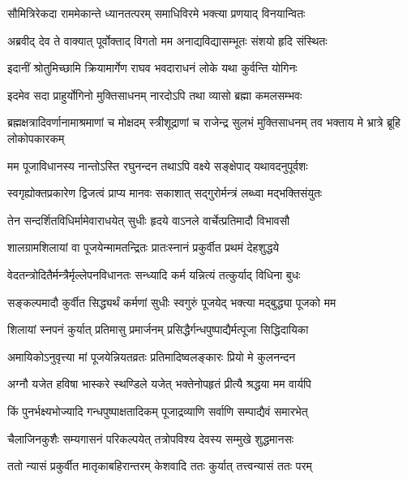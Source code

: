 \twolineshloka
{सौमित्रिरेकदा राममेकान्ते ध्यानतत्परम्}
{समाधिविरमे भक्त्या प्रणयाद् विनयान्वितः} %

\twolineshloka
{अब्रवीद् देव ते वाक्यात् पूर्वोक्ताद् विगतो मम}
{अनाद्यविद्यासम्भूतः संशयो हृदि संस्थितः} %

\twolineshloka
{इदानीं श्रोतुमिच्छामि क्रियामार्गेण राघव}
{भवदाराधनं लोके यथा कुर्वन्ति योगिनः} %

\twolineshloka
{इदमेव सदा प्राहुर्योगिनो मुक्तिसाधनम्}
{नारदोऽपि तथा व्यासो ब्रह्मा कमलसम्भवः} %

\threelineshloka
{ब्रह्मक्षत्रादिवर्णानामाश्रमाणां च मोक्षदम्}
{स्त्रीशूद्राणां च राजेन्द्र सुलभं मुक्तिसाधनम्}
{तव भक्ताय मे भ्रात्रे ब्रूहि लोकोपकारकम्} %


\twolineshloka
{मम पूजाविधानस्य नान्तोऽस्ति रघुनन्दन}
{तथाऽपि वक्ष्ये सङ्क्षेपाद् यथावदनुपूर्वशः} %

\twolineshloka
{स्वगृह्योक्तप्रकारेण द्विजत्वं प्राप्य मानवः}
{सकाशात् सद्गुरोर्मन्त्रं लब्ध्वा मद्भक्तिसंयुतः} %

\twolineshloka
{तेन सन्दर्शितविधिर्मामेवाराधयेत् सुधीः}
{हृदये वाऽनले वार्चेत्प्रतिमादौ विभावसौ} %

\twolineshloka
{शालग्रामशिलायां वा पूजयेन्मामतन्द्रितः}
{प्रातःस्नानं प्रकुर्वीत प्रथमं देहशुद्धये} %

\twolineshloka
{वेदतन्त्रोदितैर्मन्त्रैर्मृल्लेपनविधानतः}
{सन्ध्यादि कर्म यन्नित्यं तत्कुर्याद् विधिना बुधः} %

\twolineshloka
{सङ्कल्पमादौ कुर्वीत सिद्ध्यर्थं कर्मणां सुधीः}
{स्वगुरुं पूजयेद् भक्त्या मद्बुद्ध्या पूजको मम} %

\twolineshloka
{शिलायां स्नपनं कुर्यात् प्रतिमासु प्रमार्जनम्}
{प्रसिद्धैर्गन्धपुष्पाद्यैर्मत्पूजा सिद्धिदायिका} %

\twolineshloka
{अमायिकोऽनुवृत्त्या मां पूजयेन्नियतव्रतः}
{प्रतिमादिष्वलङ्कारः प्रियो मे कुलनन्दन} %

\twolineshloka
{अग्नौ यजेत हविषा भास्करे स्थण्डिले यजेत्}
{भक्तेनोपहृतं प्रीत्यै श्रद्धया मम वार्यपि} %

\twolineshloka
{किं पुनर्भक्ष्यभोज्यादि गन्धपुष्पाक्षतादिकम्}
{पूजाद्रव्याणि सर्वाणि सम्पाद्यैवं समारभेत्} %

\twolineshloka
{चैलाजिनकुशैः सम्यगासनं परिकल्पयेत्}
{तत्रोपविश्य देवस्य सम्मुखे शुद्धमानसः} %

\twolineshloka
{ततो न्यासं प्रकुर्वीत मातृकाबहिरान्तरम्}
{केशवादि ततः कुर्यात् तत्त्वन्यासं ततः परम्} %

